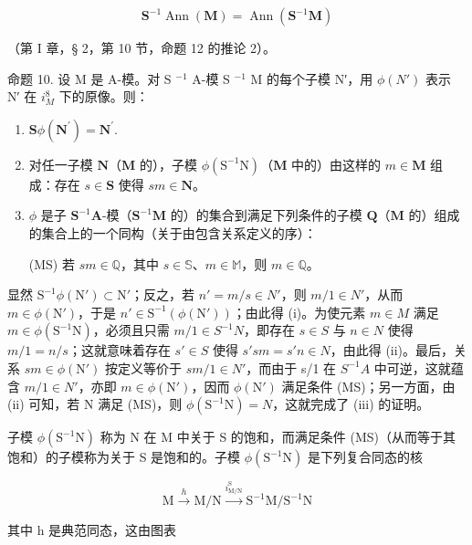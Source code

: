 \[
\mathbf {S} ^ {- 1} \operatorname{Ann} (\mathbf {M}) = \operatorname{Ann} (\mathbf {S} ^ {- 1} \mathbf {M})\tag{9}
\]

（第 I 章，§ 2，第 10 节，命题 12 的推论 2）。

命题 10. 设 M 是 A-模。对 S \(^{-1}\) A-模 S \(^{-1}\) M 的每个子模 N′，用 \(\phi(N')\) 表示 N′ 在 \(i_{M}^{8}\) 下的原像。则：

\begin{enumerate}
\def\labelenumi{(\roman{enumi})}
\item
  \(\mathbf{S}\phi(\mathbf{N}^{\prime}) = \mathbf{N}^{\prime}.\)
\item
  对任一子模 \(\mathbf{N}\)（\(\mathbf{M}\) 的），子模 \(\phi (\mathrm{S}^{-1}\mathrm{N})\)（\(\mathbf{M}\) 中的）由这样的 \(m\in \mathbf{M}\) 组成：存在 \(s\in \mathbf{S}\) 使得 \(sm\in \mathbf{N}\)。
\item
  \(\phi\) 是子 \(\mathbf{S}^{-1}\mathbf{A}\)-模（\(\mathbf{S}^{-1}\mathbf{M}\) 的）的集合到满足下列条件的子模 \(\mathbf{Q}\)（\(\mathbf{M}\) 的）组成的集合上的一个同构（关于由包含关系定义的序）：

(MS) 若 \(sm \in \mathbb{Q}\)，其中 \(s \in \mathbb{S}\)、\(m \in \mathbb{M}\)，则 \(m \in \mathbb{Q}\)。

\end{enumerate}
显然 \(\mathrm{S}^{-1}\phi(\mathrm{N}')\subset\mathrm{N}'\)；反之，若 \(n' = m/s \in N'\)，则 \(m/1 \in N'\)，从而 \(m \in \phi(\mathrm{N}')\)，于是 \(n' \in \mathrm{S}^{-1}(\phi(\mathrm{N'}))\)；由此得 (i)。为使元素 \(m \in M\) 满足 \(m \in \phi(\mathrm{S}^{-1}\mathrm{N})\)，必须且只需 \(m/1 \in S^{-1}N\)，即存在 \(s \in S\) 与 \(n \in N\) 使得 \(m/1 = n/s\)；这就意味着存在 \(s' \in S\) 使得 \(s'sm = s'n \in N\)，由此得 (ii)。最后，关系 \(sm \in \phi(\mathrm{N}')\) 按定义等价于 \(sm/1 \in N'\)，而由于 s/1 在 \(S^{-1}A\) 中可逆，这就蕴含 \(m/1 \in N'\)，亦即 \(m \in \phi(\mathrm{N}')\)，因而 \(\phi(\mathrm{N}')\) 满足条件 (MS)；另一方面，由 (ii) 可知，若 N 满足 (MS)，则 \(\phi(\mathrm{S}^{-1}\mathrm{N}) = N\)，这就完成了 (iii) 的证明。

子模 \(\phi(\mathrm{S}^{-1}\mathrm{N})\) 称为 N 在 M 中关于 S 的饱和，而满足条件 (MS)（从而等于其饱和）的子模称为关于 S 是饱和的。子模 \(\phi(\mathrm{S}^{-1}\mathrm{N})\) 是下列复合同态的核

\[
\mathrm{M} \xrightarrow {h} \mathrm{M} / \mathrm{N} \xrightarrow {i _ {\mathrm{M} / \mathrm{N}} ^ {\mathrm{S}}} \mathrm{S} ^ {- 1} \mathrm{M} / \mathrm{S} ^ {- 1} \mathrm{N}
\]

其中 h 是典范同态，这由图表


